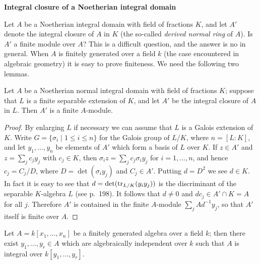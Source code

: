 \medskip
\noindent\textbf{Integral closure of a Noetherian integral domain}

Let $A$ be a Noetherian integral domain with field of fractions $K$, and let $A'$
denote the integral closure of $A$ in $K$ (the so-called \emph{derived normal ring} of
$A$). Is $A'$ a finite module over $A$? This is a difficult question, and the answer
is no in general. When $A$ is finitely generated over a field $k$ (the case
encountered in algebraic geometry) it is easy to prove finiteness. We need the
following two lemmas.

\begin{lemma}\label{lem:33.1}
Let $A$ be a Noetherian normal integral domain with field of fractions $K$;
suppose that $L$ is a finite separable extension of $K$, and let $A'$ be the
integral closure of $A$ in $L$. Then $A'$ is a finite $A$-module.
\end{lemma}

\begin{proof}
By enlarging $L$ if necessary we can assume that $L$ is a Galois extension of $K$.
Write $G = \{\sigma_i \mid 1 \le i \le n\}$ for the Galois group of $L/K$, where
$n = [L : K]$, and let $y_1, \ldots, y_n$ be elements of $A'$ which form a basis of $L$
over $K$. If $z \in A'$ and $z = \sum_j c_jy_j$ with $c_j \in K$, then
$\sigma_iz = \sum_j c_j\sigma_iy_j$ for $i = 1, \ldots, n$, and hence
$c_j = C_j/D$, where $D = \det(\sigma_iy_j)$ and $C_j \in A'$. Putting $d = D^2$ we see
$d \in K$. In fact it is easy to see that $d = \det(\operatorname{tr}_{L/K}(y_iy_j))$ is the
discriminant of the separable $K$-algebra $L$ (see p.~198). It follows that
$d \ne 0$ and $dc_j \in A' \cap K = A$ for all $j$. Therefore $A'$ is contained in the
finite $A$-module $\sum_j Ad^{-1}y_j$, so that $A'$ itself is finite over $A$.
\end{proof}

\begin{lemma}\label{lem:33.2}
Let $A = k[x_1, \ldots, x_n]$ be a finitely generated algebra over a field $k$; then
there exist $y_1, \ldots, y_r \in A$ which are algebraically independent over $k$ such
that $A$ is integral over $k[y_1, \ldots, y_r]$.
\end{lemma}

